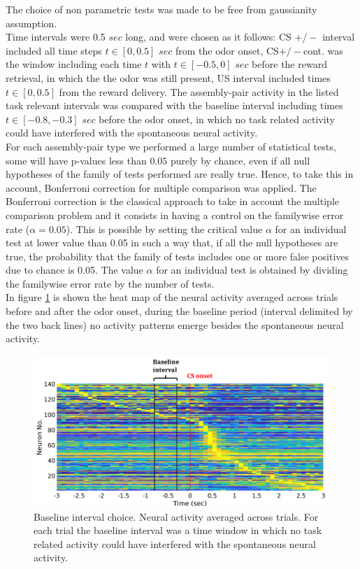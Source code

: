 The choice of non parametric tests was made to be free from gaussianity assumption.\\Time intervals were 0.5 $sec$ long, and were chosen as it follows: CS $+/-$ interval included all time steps $t \in [0, 0.5]$ $sec$ from the odor onset, CS$+/-$cont. was the window including each time $t$ with $t \in [-0.5, 0]$ $sec$ before the reward retrieval, in which the the odor was still present, US interval included times $t \in [0,0.5]$ from the reward delivery. The assembly-pair activity in the listed task relevant intervals was compared with the baseline interval including times $t \in [-0.8, -0.3]$ $sec$ before the odor onset, in which no task related activity could have interfered with the spontaneous neural activity.\\For each assembly-pair type we performed a large number of statistical tests, some will have p-values less than $0.05$ purely by chance, even if all null hypotheses of the family of tests performed are really true. Hence, to take this in account, Bonferroni correction for multiple comparison was applied. The Bonferroni correction is the classical approach to take in account the multiple comparison problem and it consists in having a control on the familywise error rate ($\alpha=0.05$). This is possible by setting the critical value $\alpha$ for an individual test at lower value than 0.05 in such a way that, if all the null hypotheses are true, the probability that the family of tests includes one or more false positives due to chance is 0.05. The value $\alpha$ for an individual test is obtained by dividing the familywise error rate by the number of tests.\\In figure \ref{fig:Baseline} is shown the heat map of the neural activity averaged across trials before and after the odor onset, during the baseline period (interval delimited by the two back lines) no activity patterns emerge besides the spontaneous neural activity.\\
\begin{figure}
    \centering
    \includegraphics[scale=0.6]{figures/Baseline.png}
    \caption{Baseline interval choice. Neural activity averaged across trials. For each trial the baseline interval was a time window in which no task related activity could have interfered with the spontaneous neural activity.}
    \label{fig:Baseline}
\end{figure}
